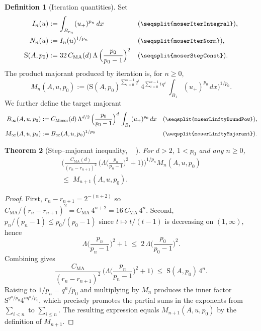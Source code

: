 \documentclass[11pt]{amsart}
\newcommand{\Bz}[1]{B_{#1}}
\newcommand{\leanname}[1]{%
  \begingroup
  \textnormal{\small\texttt{%
    \let\oldunderscore\_%
    \def\_{\oldunderscore\discretionary{}{}{}}%
    \seqsplit{#1}}}%
  \endgroup}
\newtheorem{theorem}{Theorem}[section]
\theoremstyle{definition}
\newtheorem{definition}[theorem]{Definition}
\theoremstyle{remark}
\begin{document}
\begin{definition}[Iteration quantities]
Set
\begin{align*}
  I_n(u) &:= \int_{\Bz{r_n}} (u_+)^{p_n}\,dx
    && (\text{\leanname{moserIterIntegral}}), \\
  N_n(u) &:= I_n(u)^{1/p_n}
    && (\text{\leanname{moserIterNorm}}), \\
  \mathrm{S}(A,p_0) &:= 32\,C_{\mathrm{MA}}(d)\,\Lambda\,\Big(\frac{p_0}{p_0-1}\Big)^{2}
    && (\text{\leanname{moserStepConst}}).
\end{align*}
The product majorant produced by iteration is, for $n \geq 0$,
\begin{equation*}
  M_n(A,u,p_0) :=
  \Big(
    \mathrm{S}(A,p_0)^{\sum_{i=0}^{n-1} q^{i}}\,
    4^{\sum_{i=0}^{n-1} i\,q^{i}}\,
    \int_{\Bz{1}} (u_+)^{p_0}\,dx
  \Big)^{1/p_0}.
\end{equation*}
We further define the target majorant
\begin{align*}
  B_\infty(A,u,p_0) &:= C_{\mathrm{Moser}}(d)\,\Lambda^{d/2}\,
    \Big(\frac{p_0}{p_0-1}\Big)^{d}\,\int_{\Bz{1}} (u_+)^{p_0}\,dx
    && (\text{\leanname{moserLinftyBoundPow}}), \\
  M_\infty(A,u,p_0) &:= B_\infty(A,u,p_0)^{1/p_0}
    && (\text{\leanname{moserLinftyMajorant}}).
\end{align*}
\end{definition}

\begin{theorem}[Step--majorant inequality, \leanname{moser\_step\_majorant\_le}]
\label{thm:moser-step-maj}
For $d > 2$, $1 < p_0$ and any $n \geq 0$,
\begin{multline*}
  \Big(\frac{C_{\mathrm{MA}}(d)}{(r_n-r_{n+1})^{2}}\,
    \Big(\Lambda\Big(\frac{p_n}{p_n-1}\Big)^{2}+1\Big)\Big)^{1/p_n}
  M_n(A,u,p_0) \\
  \leq\;
  M_{n+1}(A,u,p_0).
\end{multline*}
\end{theorem}

\begin{proof}
First, $r_n - r_{n+1} = 2^{-(n+2)}$ so
$C_{\mathrm{MA}}/(r_n-r_{n+1})^2 = C_{\mathrm{MA}}\,4^{n+2} = 16\,C_{\mathrm{MA}}\,4^{n}$.
Second, $p_n/(p_n-1) \leq p_0/(p_0-1)$ since $t \mapsto t/(t-1)$ is decreasing
on $(1,\infty)$, hence
\[
  \Lambda\Big(\frac{p_n}{p_n-1}\Big)^{2}+1
  \;\leq\; 2\,\Lambda\Big(\frac{p_0}{p_0-1}\Big)^{2}.
\]
Combining gives
\begin{equation*}
  \frac{C_{\mathrm{MA}}}{(r_n-r_{n+1})^{2}}\,
    \Big(\Lambda\Big(\frac{p_n}{p_n-1}\Big)^{2}+1\Big)
  \;\leq\;
  \mathrm{S}(A,p_0)\,4^{n}.
\end{equation*}
Raising to $1/p_n = q^n/p_0$ and multiplying by $M_n$ produces the inner factor
$\mathrm{S}^{q^n/p_0} 4^{n q^n/p_0}$, which precisely promotes the partial sums
in the exponents from $\sum_{i<n}$ to $\sum_{i\leq n}$. The resulting expression
equals $M_{n+1}(A,u,p_0)$ by the definition of $M_{n+1}$.
\end{proof}
\end{document}
